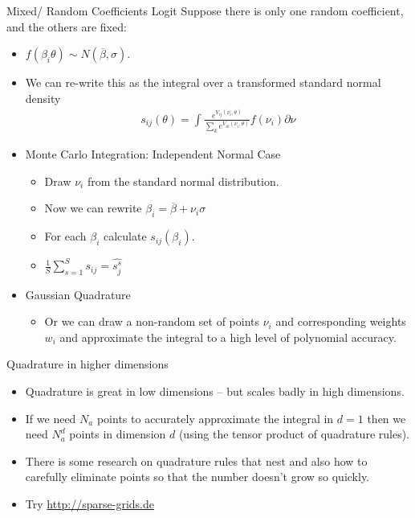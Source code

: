 \documentclass[xcolor=pdftex,dvipsnames,table,mathserif,aspectratio=169]{beamer}
\begin{document}
\begin{frame}{Mixed/ Random Coefficients Logit}
Suppose there is only one random coefficient, and the others are fixed:
\begin{itemize}
\item $f(\beta_i \theta) \sim N(\overline{\beta},\sigma)$.
\item We can re-write this as the integral over a transformed standard normal density
\begin{eqnarray*}
s_{ij}(\theta) = \int \frac{ e^{V_{ij}(\nu_i,\theta)}}{\sum_k e^{V_{ik}(\nu_i,\theta)}} f(\nu_i) \partial \nu
\end{eqnarray*}
\item Monte Carlo Integration: Independent Normal Case
\begin{itemize}
\item Draw $\nu_i$ from the standard normal distribution.
\item Now we can rewrite $\beta_i = \overline{\beta} + \nu_i \sigma$
\item For each $\beta_i$ calculate $s_{ij}(\beta_i)$.
\item $\frac{1}{S} \sum_{s=1}^S s_{ij} = \widehat{s_{j}^{s}}$
\end{itemize}
\item Gaussian Quadrature
\begin{itemize}
\item Or we can draw a non-random set of points $\nu_i$ and corresponding weights $w_i$ and approximate the integral to a high level of polynomial accuracy.
\end{itemize}
\end{itemize}
\end{frame}

\begin{frame}{Quadrature in higher dimensions}
\begin{itemize}
\item Quadrature is great in low dimensions -- but scales badly in high dimensions.
\item If we need $N_a$ points to accurately approximate the integral in $d=1$ then we need $N_a^d$ points in dimension $d$ (using the tensor product of quadrature rules).
\item There is some research on quadrature rules that nest and also how to carefully eliminate points so that the number doesn't grow so quickly.
\item Try \url{http://sparse-grids.de}
\end{itemize}
\end{frame}
\end{document}
